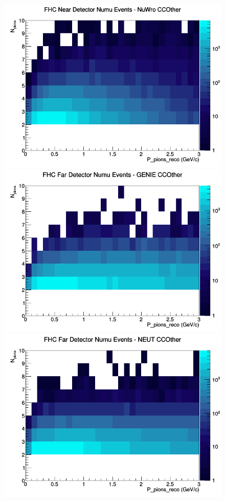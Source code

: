 \documentclass[12pt]{article}
\begin{document}
\begin{figure}[h]
\includegraphics[width=\linewidth]{eff_N_P/FGT/pions/CCOther_FHC_ND_numu_N_P_NuWro.png}
\endminipage
\newline
{}
\includegraphics[width=\linewidth]{eff_N_P/FGT/pions/CCOther_FHC_FD_numu_N_P_GENIE.png}
\endminipage
{}
\includegraphics[width=\linewidth]{eff_N_P/FGT/pions/CCOther_FHC_FD_numu_N_P_NEUT.png}

\end{figure}
\end{document}
